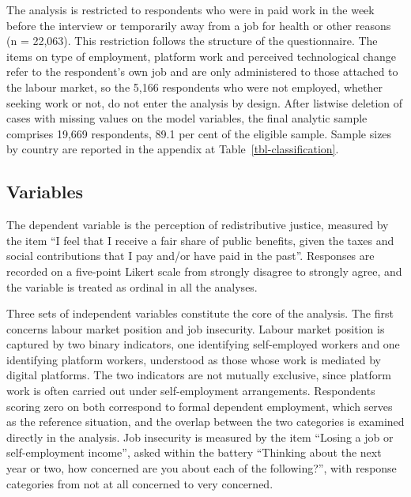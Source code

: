 \documentclass[
  12pt,
]{article}
\begin{document}
The analysis is restricted to respondents who were in paid work in the
week before the interview or temporarily away from a job for health or
other reasons (n = 22,063). This restriction follows the structure of
the questionnaire. The items on type of employment, platform work and
perceived technological change refer to the respondent's own job and are
only administered to those attached to the labour market, so the 5,166
respondents who were not employed, whether seeking work or not, do not
enter the analysis by design. After listwise deletion of cases with
missing values on the model variables, the final analytic sample
comprises 19,669 respondents, 89.1 per cent of the eligible sample.
Sample sizes by country are reported in the appendix at
Table~\ref{tbl-classification}.

\subsection{Variables}\label{variables}

The dependent variable is the perception of redistributive justice,
measured by the item ``I feel that I receive a fair share of public
benefits, given the taxes and social contributions that I pay and/or
have paid in the past''. Responses are recorded on a five-point Likert
scale from strongly disagree to strongly agree, and the variable is
treated as ordinal in all the analyses.

Three sets of independent variables constitute the core of the analysis.
The first concerns labour market position and job insecurity. Labour
market position is captured by two binary indicators, one identifying
self-employed workers and one identifying platform workers, understood
as those whose work is mediated by digital platforms. The two indicators
are not mutually exclusive, since platform work is often carried out
under self-employment arrangements. Respondents scoring zero on both
correspond to formal dependent employment, which serves as the reference
situation, and the overlap between the two categories is examined
directly in the analysis. Job insecurity is measured by the item
``Losing a job or self-employment income'', asked within the battery
``Thinking about the next year or two, how concerned are you about each
of the following?'', with response categories from not at all concerned
to very concerned.
\end{document}
